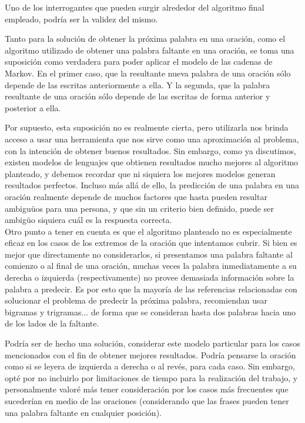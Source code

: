 \documentclass[a4paper]{article}
\begin{document}
Uno de los interrogantes que pueden surgir alrededor del algoritmo final empleado, podría ser la validez del mismo. 

Tanto para la solución de obtener la próxima palabra en una oración, como el algoritmo utilizado de obtener una palabra faltante en una oración, se toma una suposición como verdadera para poder aplicar el modelo de las cadenas de Markov. En el primer caso, que la resultante nueva palabra de una oración sólo depende de las escritas anteriormente a ella. Y la segunda, que la palabra resultante de una oración sólo depende de las escritas de forma anterior y posterior a ella. 

Por supuesto, esta suposición no es realmente cierta, pero utilizarla nos brinda acceso a usar una herramienta que nos sirve como una aproximación al problema, con la intención de obtener buenos resultados. Sin embargo, como ya discutimos, existen modelos de lenguajes que obtienen resultados mucho mejores al algoritmo planteado, y debemos recordar que ni siquiera los mejores modelos generan resultados perfectos. Incluso más allá de ello, la predicción de una palabra en una oración realmente depende de muchos factores que hasta pueden resultar ambiguüos para una persona, y que sin un criterio bien definido, puede ser ambigüo siquiera cuál es la respuesta correcta. \\

Otro punto a tener en cuenta es que el algoritmo planteado no es especialmente eficaz en los casos de los extremos de la oración que intentamos cubrir. Si bien es mejor que directamente no considerarlos, si presentamos una palabra faltante al comienzo o al final de una oración, muchas veces la palabra inmediatamente a su derecha o izquierda (respectivamente) no provee demasiada información sobre la palabra a predecir. Es por esto que la mayoría de las referencias relacionadas con solucionar el problema de predecir la próxima palabra, recomiendan usar bigramas y trigramas... de forma que se consideran hasta dos palabras hacia uno de los lados de la faltante.\cite{TdsGen}\cite{CambridgeLecture}\cite{WikiNgram}

Podría ser de hecho una solución, considerar este modelo particular para los casos mencionados con el fin de obtener mejores resultados. Podría pensarse la oración como si se leyera de izquierda a derecha o al revés, para cada caso. Sin embargo, opté por no incluirlo por limitaciones de tiempo para la realización del trabajo, y personalmente valoré más tener consideración por los casos más frecuentes que sucederían en medio de las oraciones (considerando que las frases pueden tener una palabra faltante en cualquier posición).\\
\end{document}
